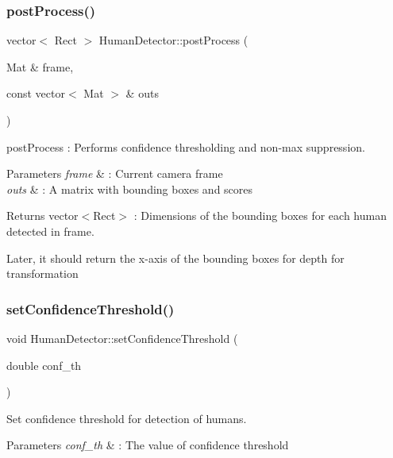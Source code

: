 \subsubsection{\texorpdfstring{post\+Process()}{postProcess()}}
{\footnotesize\ttfamily vector$<$ Rect $>$ Human\+Detector\+::post\+Process (\begin{DoxyParamCaption}\item[{Mat \&}]{frame,  }\item[{const vector$<$ Mat $>$ \&}]{outs }\end{DoxyParamCaption})}



post\+Process \+: Performs confidence thresholding and non-\/max suppression. 


\begin{DoxyParams}{Parameters}
{\em frame} & \+: Current camera frame \\
\hline
{\em outs} & \+: A matrix with bounding boxes and scores \\
\hline
\end{DoxyParams}
\begin{DoxyReturn}{Returns}
vector$<$\+Rect$>$ \+: Dimensions of the bounding boxes for each human detected in frame. 
\end{DoxyReturn}
Later, it should return the x-\/axis of the bounding boxes for depth for transformation\mbox{\label{classHumanDetector_aef7db39618f879d6e531e1f681553584}} 
\subsubsection{\texorpdfstring{set\+Confidence\+Threshold()}{setConfidenceThreshold()}}
{\footnotesize\ttfamily void Human\+Detector\+::set\+Confidence\+Threshold (\begin{DoxyParamCaption}\item[{double}]{conf\+\_\+th }\end{DoxyParamCaption})}



Set confidence threshold for detection of humans. 


\begin{DoxyParams}{Parameters}
{\em conf\+\_\+th} & \+: The value of confidence threshold \\
\hline
\end{DoxyParams}
\mbox{\label{classHumanDetector_a2120c8b55ea174c3742573ef9ed4549f}} 
